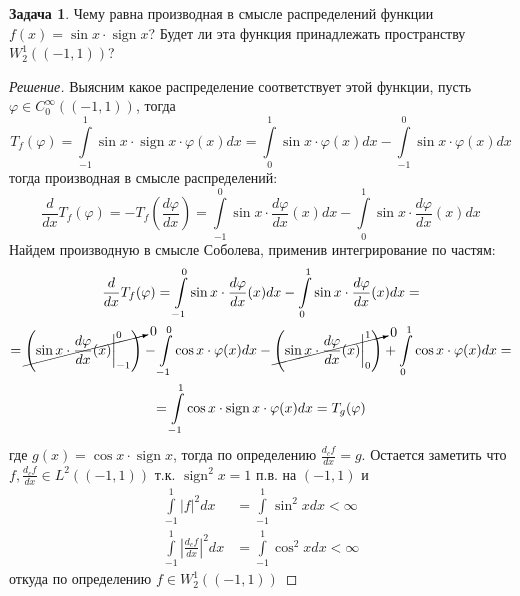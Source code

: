 \documentclass[12pt,a4paper]{article}
\theoremstyle{definition}
\newtheorem{exercise}{Задача}
\newenvironment{solution}
{\renewcommand\qedsymbol{$\blacksquare$}\begin{proof}[Решение]}
{\end{proof}}
\DeclareMathOperator{\sign}{sign}
\begin{document}
\addtocounter{exercise}{3}

\begin{exercise}
	Чему равна производная в смысле распределений функции \\ $f(x) = \sin{x} \cdot \sign{x}$? Будет ли эта функция принадлежать пространству $W_2^1 ((-1, 1))$?
\end{exercise}
\begin{solution}
	Выясним какое распределение соответствует этой функции, пусть $\varphi \in C_0^\infty ((-1, 1))$, тогда
	\begin{equation*}
		T_f (\varphi) = \int\limits_{-1}^{1}{\sin{x} \cdot \sign{x} \cdot \varphi (x) dx} = \int\limits_{0}^{1}{\sin{x} \cdot \varphi(x) dx} - \int\limits_{-1}^{0}{\sin{x} \cdot \varphi(x) dx}
	\end{equation*}
	тогда производная в смысле распределений:
	\begin{equation*}
		\frac{d}{dx} T_f (\varphi) = - T_f \left(\frac{d\varphi}{dx}\right) = \int\limits_{-1}^{0}{\sin{x} \cdot \frac{d\varphi}{dx} (x) dx} - \int\limits_{0}^{1}{\sin{x} \cdot \frac{d\varphi}{dx} (x) dx} 
	\end{equation*}
	Найдем производную в смысле Соболева, применив интегрирование по частям:
	\begin{multline*}
		\frac{d}{dx} T_f (\varphi) = \int\limits_{-1}^{0}{\sin{x} \cdot \frac{d\varphi}{dx} (x) dx} - \int\limits_{0}^{1}{\sin{x} \cdot \frac{d\varphi}{dx} (x) dx} = \\ = 
		\cancelto{0}{\left( \sin{x} \cdot \frac{d\varphi}{dx} (x) \biggr\rvert_{-1}^{0} \right)} - \int\limits_{-1}^{0}{\cos{x} \cdot \varphi(x) dx} - \cancelto{0}{\left( \sin{x} \cdot \frac{d\varphi}{dx} (x) \biggr\rvert_{0}^{1} \right)} + \int\limits_{0}^{1}{\cos{x} \cdot \varphi(x) dx} = \\ = \int\limits_{-1}^{1}{\cos{x} \cdot \sign{x} \cdot \varphi(x) dx} = T_g (\varphi)
	\end{multline*}
	где $g(x) = \cos{x} \cdot \sign{x}$, тогда по определению $\frac{d_c f}{dx} = g$. Остается заметить что $f, \frac{d_c f}{dx} \in L^2 ((-1, 1))$ т.к. $\sign^2 {x} = 1$ п.в. на $(-1, 1)$ и
	\begin{align*}
		\int\limits_{-1}^{1}{|f|^2 dx} &= \int\limits_{-1}^{1}{\sin^2 {x} dx} < \infty \\
		\int\limits_{-1}^{1}{\left|\frac{d_c f}{dx}\right|^2 dx} &= \int\limits_{-1}^{1}{\cos^2 {x} dx} < \infty
	\end{align*}
	откуда по определению $f \in W_2^1 ((-1, 1))$
\end{solution}
\newpage
\end{document}
